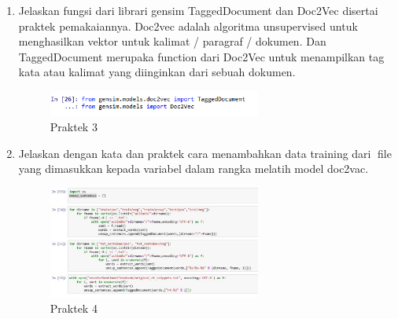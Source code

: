\begin{enumerate}
	\item Jelaskan fungsi dari librari gensim TaggedDocument dan Doc2Vec disertai praktek pemakaiannya.
	\hfill\break
	Doc2vec adalah algoritma unsupervised untuk menghasilkan vektor untuk kalimat / paragraf / dokumen. Dan TaggedDocument merupaka function dari Doc2Vec untuk menampilkan tag kata atau kalimat yang diinginkan dari sebuah dokumen.

		\begin{figure}[H]
			\includegraphics[width=7cm]{figures/1174077/5/p25.png}
			\centering
			\caption{Praktek 3}
		\end{figure}
	\item Jelaskan dengan kata dan praktek cara menambahkan data training dari file yang dimasukkan kepada variabel dalam rangka melatih model doc2vac.
	\hfill\break
	
		\begin{figure}[H]
			\includegraphics[width=7cm]{figures/1174077/5/p1r.png}
			\centering
			\caption{Praktek 4}
		\end{figure}
		

\end{enumerate}
